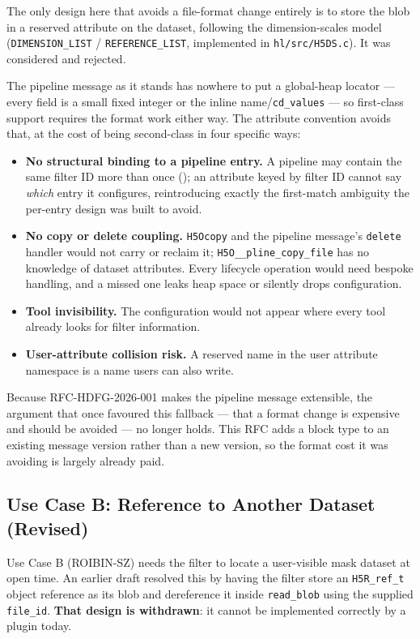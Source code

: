 \documentclass[../RFC-HDFG-2026-003.tex]{subfiles}
\begin{document}
The only design here that avoids a file-format change entirely is to
store the blob in a reserved attribute on the dataset, following the
dimension-scales model (\texttt{DIMENSION\_LIST} /
\texttt{REFERENCE\_LIST}, implemented in \texttt{hl/src/H5DS.c}).  It was
considered and rejected.

The pipeline message as it stands has nowhere to put a global-heap
locator --- every field is a small fixed integer or the inline
name/\texttt{cd\_values} --- so first-class support requires the format
work either way.  The attribute convention avoids that, at the cost of
being second-class in four specific ways:

\begin{itemize}
\item \textbf{No structural binding to a pipeline entry.}  A pipeline may
  contain the same filter ID more than once
  (); an attribute keyed by filter ID
  cannot say \emph{which} entry it configures, reintroducing exactly the
  first-match ambiguity the per-entry design was built to avoid.
\item \textbf{No copy or delete coupling.}  \texttt{H5Ocopy} and the
  pipeline message's \texttt{delete} handler would not carry or reclaim
  it; \texttt{H5O\_\_pline\_copy\_file} has no knowledge of dataset
  attributes.  Every lifecycle operation would need bespoke handling, and
  a missed one leaks heap space or silently drops configuration.
\item \textbf{Tool invisibility.}  The configuration would not appear
  where every tool already looks for filter information.
\item \textbf{User-attribute collision risk.}  A reserved name in the
  user attribute namespace is a name users can also write.
\end{itemize}

Because RFC-HDFG-2026-001 makes the pipeline message extensible, the
argument that once favoured this fallback --- that a format change is
expensive and should be avoided --- no longer holds.  This RFC adds a
block type to an existing message version rather than a new version, so
the format cost it was avoiding is largely already paid.

\subsection{Use Case B: Reference to Another Dataset (Revised)}
\label{sec:blob-usecaseb}

Use Case B (ROIBIN-SZ) needs the filter to locate a user-visible mask
dataset at open time. An earlier draft resolved this by having the
filter store an \texttt{H5R\_ref\_t} object reference as its blob and
dereference it inside \texttt{read\_blob} using the supplied
\texttt{file\_id}. \textbf{That design is withdrawn}: it cannot be
implemented correctly by a plugin today.
\end{document}
